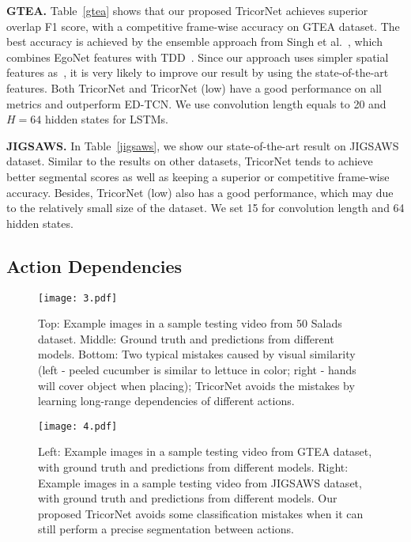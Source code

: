 \documentclass{article}
\begin{document}
\noindent \textbf{GTEA.} \quad Table~\ref{gtea} shows that our proposed TricorNet achieves superior overlap F1 score, with a competitive frame-wise accuracy on GTEA dataset. The best accuracy is achieved by the ensemble approach from Singh et al.~\cite{ego}, which combines EgoNet features with TDD~\cite{tdd}. Since our approach uses simpler spatial features as~\cite{LeFlViCVPR2017}, it is very likely to improve our result by using the state-of-the-art features. Both TricorNet and TricorNet (low) have a good performance on all metrics and outperform ED-TCN. We use convolution length equals to 20 and $H = 64$ hidden states for LSTMs. 

\noindent \textbf{JIGSAWS.} \quad In Table~\ref{jigsaws}, we show our state-of-the-art result on JIGSAWS dataset. Similar to the results on other datasets, TricorNet tends to achieve better segmental scores as well as keeping a superior or competitive frame-wise accuracy. Besides, TricorNet (low) also has a good performance, which may due to the relatively small size of the dataset. We set 15 for convolution length and 64 hidden states.


\subsection{Action Dependencies}

\begin{figure}[t]
\centering
\texttt{[image: 3.pdf]}
\caption{Top: Example images in a sample testing video from 50 Salads dataset. Middle: Ground truth and predictions from different models. Bottom: Two typical mistakes caused by visual similarity (left - peeled cucumber is similar to lettuce in color; right - hands will cover object when placing); TricorNet avoids the mistakes by learning long-range dependencies of different actions.}
\label{f3}
\end{figure}

\begin{figure}[t]
\centering
\texttt{[image: 4.pdf]}
\caption{Left: Example images in a sample testing video from GTEA dataset, with ground truth and predictions from different models. Right: Example images in a sample testing video from JIGSAWS dataset, with ground truth and predictions from different models. Our proposed TricorNet avoids some classification mistakes when it can still perform a precise segmentation between actions.}
\label{f4}
\end{figure}
\end{document}
